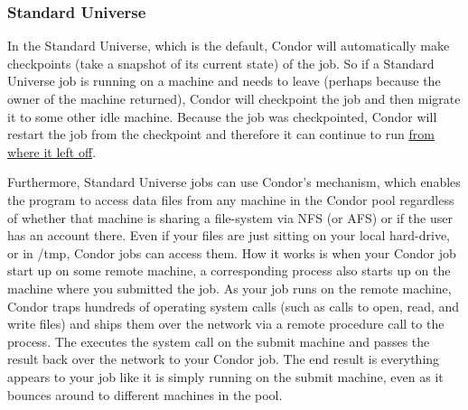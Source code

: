 \subsubsection{Standard Universe}
\label{sec:standard-universe}

In the Standard Universe, which is the default, Condor will
automatically make checkpoints (take a snapshot of its current state) of
the job. So if a Standard Universe job is running on a machine and needs
to leave (perhaps because the owner of the machine returned), Condor
will checkpoint the job and then migrate it to some other idle machine.
Because the job was checkpointed, Condor will restart the job from the
checkpoint and therefore it can continue to run \underline{from where it
left off}. 

Furthermore, Standard Universe jobs can use Condor's  mechanism, which enables the program to access data files from
any machine in the Condor pool regardless of whether that machine is
sharing a file-system via NFS (or AFS) or if the user has an account
there. Even if your files are just sitting on your local hard-drive, or
in /tmp, Condor jobs can access them.  How it works is when your Condor
job start up on some remote machine, a corresponding 
process also starts up on the machine where you submitted the job.
As your job runs on the remote machine, Condor traps hundreds of operating system 
calls (such as calls to open, read, and
write files) and ships them over the network via a remote procedure call
to the  process.  The  executes the system
call on the submit machine and passes the result back over the network
to your Condor job.  The end result is everything appears to your job
like it is simply running on the submit machine, even as it bounces
around to different machines in the pool.

